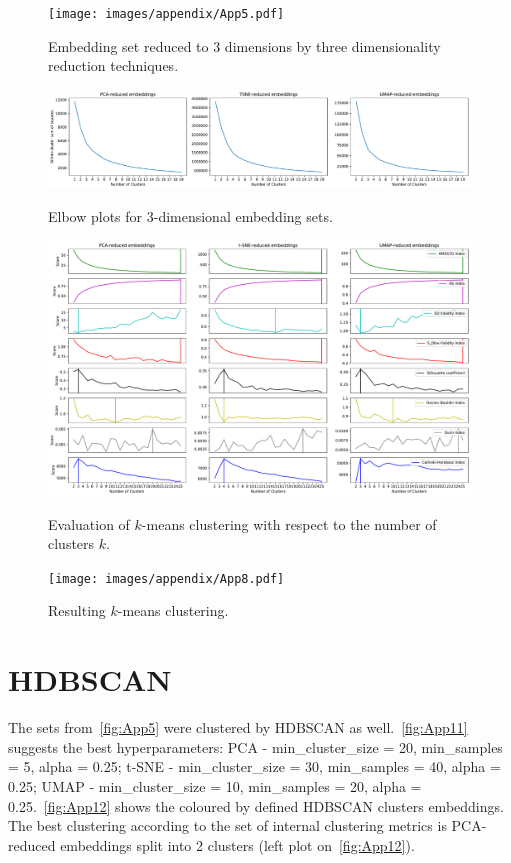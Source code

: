 \begin{figure}[!ht]
	\centering
	\texttt{[image: images/appendix/App5.pdf]}\\
	\caption{Embedding set reduced to 3 dimensions by three dimensionality reduction techniques.}
	\label{fig:App5}
\end{figure}
\begin{figure}[!ht]
	\centering
	\includegraphics[width=1.0\textwidth]{images/appendix/App6.pdf}\\
	\caption{Elbow plots for 3-dimensional embedding sets.}
	\label{fig:App6}
\end{figure}
\begin{figure}[!ht]
	\centering
	\includegraphics[width=1.0\textwidth]{images/appendix/App7.pdf}\\
	\caption{Evaluation of $k$-means clustering with respect to the number of clusters $k$.}
	\label{fig:App7}
\end{figure}
\begin{figure}[!ht]
	\centering
	\texttt{[image: images/appendix/App8.pdf]}\\
	\caption{Resulting $k$-means clustering.}
	\label{fig:App8}
\end{figure}

\section{HDBSCAN}
The sets from~\autoref{fig:App5} were clustered by HDBSCAN as well.~\autoref{fig:App11} suggests the best hyperparameters: PCA - min\_cluster\_size = 20, min\_samples = 5, alpha = 0.25;
t-SNE - min\_cluster\_size = 30, min\_samples = 40, alpha = 0.25; UMAP - min\_cluster\_size = 10, min\_samples = 20, alpha = 0.25.~\autoref{fig:App12} shows the coloured by defined HDBSCAN clusters embeddings. The best clustering according to the set of internal clustering metrics is PCA-reduced embeddings split into 2 clusters (left plot on~\autoref{fig:App12}).

